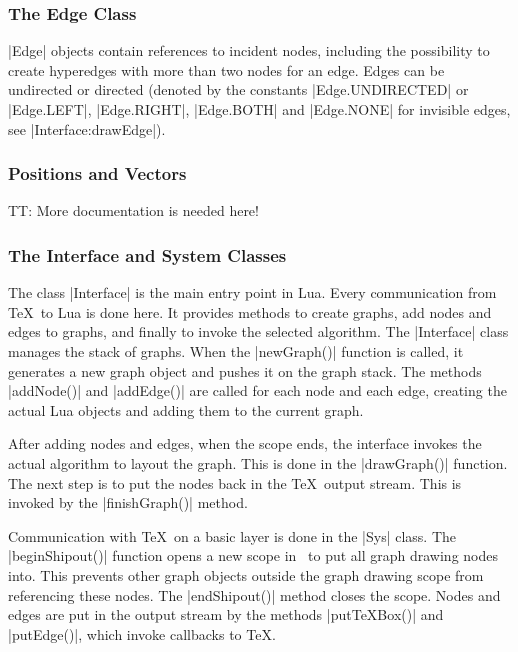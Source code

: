 \subsubsection{The Edge Class}

|Edge| objects contain references to incident nodes, including the
possibility to create hyperedges with more than two nodes for an edge.
Edges can be undirected or directed (denoted by the constants
|Edge.UNDIRECTED| or |Edge.LEFT|, |Edge.RIGHT|, |Edge.BOTH| and
|Edge.NONE| for invisible edges, see |Interface:drawEdge|). 

%


\subsubsection{Positions and Vectors}

TT: More documentation is needed here!

%
%


\subsubsection{The Interface and System Classes}

The class |Interface| is the main entry point in Lua. Every
communication from \TeX\ to Lua is done here. It provides methods to
create graphs, add nodes and edges to graphs, and finally to invoke the
selected algorithm. The |Interface| class manages the stack of
graphs. When the |newGraph()| function is called, it generates a new graph
object and pushes it on the graph stack. The methods |addNode()| and
|addEdge()| are called for each node and each edge, creating the
actual Lua objects and adding them to the current graph. 

After adding nodes and edges, when the scope ends, the interface
invokes the actual algorithm to layout the graph. This is done in the
|drawGraph()| function. The next step is to put the nodes back in the
\TeX\ output stream. This is invoked by the |finishGraph()| method. 

%

Communication with \TeX\ on a basic layer is done in the |Sys|
class. The |beginShipout()| function opens a new scope in \pgfname\
to put all graph drawing nodes into. This prevents other graph objects
outside the graph drawing scope from referencing these nodes. The
|endShipout()| method closes the scope. Nodes and edges are put in the
output stream by the methods |putTeXBox()| and |putEdge()|, which
invoke callbacks to \TeX. 



